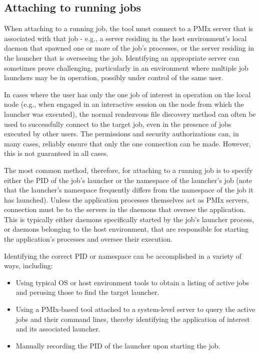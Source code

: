 \subsection{Attaching to running jobs}

When attaching to a running job, the tool must connect to a \ac{PMIx} server that is associated with that job - e.g., a server residing in the host environment's local daemon that spawned one or more of the job's processes, or the server residing in the launcher that is overseeing the job. Identifying an appropriate server can sometimes prove challenging, particularly in an environment where multiple job launchers may be in operation, possibly under control of the same user.

In cases where the user has only the one job of interest in operation on the local node (e.g., when engaged in an interactive session on the node from which the launcher was executed), the normal rendezvous file discovery method can often be used to successfully connect to the target job, even in the presence of jobs executed by other users. The permissions and security authorizations can, in many cases, reliably ensure that only the one connection can be made. However, this is not guaranteed in all cases.

The most common method, therefore, for attaching to a running job is to specify either the \ac{PID} of the job's launcher or the namespace of the launcher's job (note that the launcher's namespace frequently differs from the namespace of the job it has launched). Unless the application processes themselves act as \ac{PMIx} servers, connection must be to the servers in the daemons that oversee the application. This is typically either daemons specifically started by the job's launcher process, or daemons belonging to the host environment, that are responsible for starting the application's processes and oversee their execution.

Identifying the correct \ac{PID} or namespace can be accomplished in a variety of ways, including:

\begin{itemize}
    \item Using typical \ac{OS} or host environment tools to obtain a listing of active jobs and perusing those to find the target launcher.
    \item Using a \ac{PMIx}-based tool attached to a system-level server to query the active jobs and their command lines, thereby identifying the application of interest and its associated launcher.
    \item Manually recording the \ac{PID} of the launcher upon starting the job.
\end{itemize}

